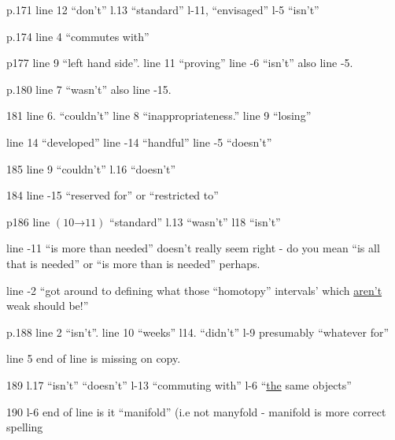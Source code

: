 p.171 line 12 ``don't'' l.13 ``standard'' l-11, ``envisaged'' l-5 ``isn't''

p.174 line 4 ``commutes with''

p177 line 9 ``left hand side''. line 11 ``proving'' line -6 ``isn't'' also line -5.

p.180 line 7 ``wasn't'' also line -15.

181 line 6. ``couldn't'' line 8 ``inappropriateness.'' line 9 ``losing''

line 14 ``developed'' line -14 ``handful'' line -5 ``doesn't''

185 line 9 ``couldn't'' l.16 ``doesn't''

\noindent{}184 line -15 ``reserved for'' or ``restricted to''

p186 line $(10\mathord{\to}11)$ ``standard'' l.13 ``wasn't'' l18 ``isn't''

line -11 ``is more than needed'' doesn't really seem right - do you mean ``is all that is needed'' or ``is more than is needed'' perhaps.

line -2 ``got around to defining  what those ``homotopy'' intervals' which \uline{aren't} weak should be!''

p.188 line 2 ``isn't''. line 10 ``weeks'' l14. ``didn't'' l-9 presumably ``whatever for''

line 5  end of line is missing on copy.

189 l.17 ``isn't'' ``doesn't'' l-13 ``commuting with'' l-6 ``\uline{the} same objects''

190 l-6 end of line is it ``manifold'' (i.e not manyfold\deleted{)} - manifold is  more correct spelling

